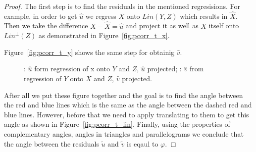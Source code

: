 \documentclass[nobib]{tufte-handout}
\theoremstyle{definition}
\begin{document}
\begin{proof}
The first step is to find the residuals in the mentioned regresisions.
For example, in order to get $\hat u$ we regress $X$ onto $Lin(Y,Z)$
which results in $\hat X$. Then we take the difference $X - \hat X = \hat u$
and project it as well as $X$ itself onto $Lin^{\perp}(Z)$ as demonstrated
in Figure~\ref{fig:pcorr_t_x}.

Figure~\ref{fig:pcorr_t_y} shows the same step for obtainig $\hat v$.

\begin{figure}[ht!]
\begin{center}
\caption{: $\hat u$ form regression of x onto $Y$ and $Z$, $\hat u$ projected;
: $\hat v$ from regression of $Y$ onto $X$ and $Z$, $\hat v$ projected.}
\end{center}
\end{figure}

After all we put these figure together and the goal is to find the angle between
the red and blue lines which is the same as the angle between the dashed
red and blue lines. However, before that we need to apply translating to them to
get this angle as shown in Figure~\ref{fig:pcorr_t_lin}. Finally, using the properties of
complementary angles, angles in triangles and parallelograms
we conclude that the angle between the residuals $\tilde u$ and $\tilde v$
is eqaul to $\varphi$.


\end{proof}
\end{document}
